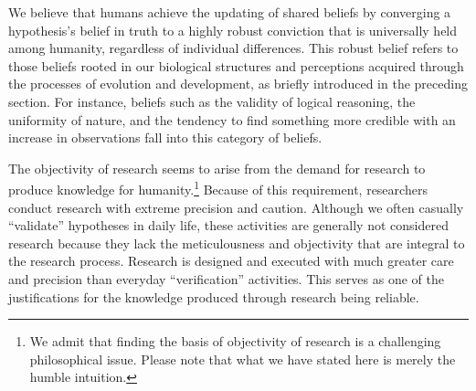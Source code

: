 \documentclass{book}
\begin{document}


We believe that humans achieve the updating of shared beliefs by converging a hypothesis's belief in truth to a highly robust conviction that is universally held among humanity, regardless of individual differences. This robust belief refers to those beliefs rooted in our biological structures and perceptions acquired through the processes of evolution and development, as briefly introduced in the preceding section. For instance, beliefs such as the validity of logical reasoning, the uniformity of nature, and the tendency to find something more credible with an increase in observations fall into this category of beliefs. 

The objectivity of research seems to arise from the demand for research to produce knowledge for humanity.\footnote{We admit that finding the basis of objectivity of research is a challenging philosophical issue. Please note that what we have stated here is merely the humble intuition. } Because of this requirement, researchers conduct research with extreme precision and caution. Although we often casually ``validate'' hypotheses in daily life, these activities are generally not considered research because they lack the meticulousness and objectivity that are integral to the research process. Research is designed and executed with much greater care and precision than everyday ``verification'' activities. This serves as one of the justifications for the knowledge produced through research being reliable.
\end{document}
